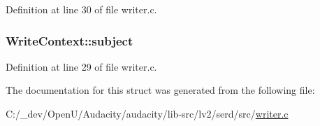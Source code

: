 Definition at line 30 of file writer.\+c.

\subsubsection[{\texorpdfstring{subject}{subject}}]{ Write\+Context\+::subject}\hypertarget{struct_write_context_a2b2d587c9e3a63827cb6d40e18c1981f}{}\label{struct_write_context_a2b2d587c9e3a63827cb6d40e18c1981f}


Definition at line 29 of file writer.\+c.



The documentation for this struct was generated from the following file\+:\begin{DoxyCompactItemize}
\item 
C\+:/\+\_\+dev/\+Open\+U/\+Audacity/audacity/lib-\/src/lv2/serd/src/\hyperlink{writer_8c}{writer.\+c}\end{DoxyCompactItemize}
